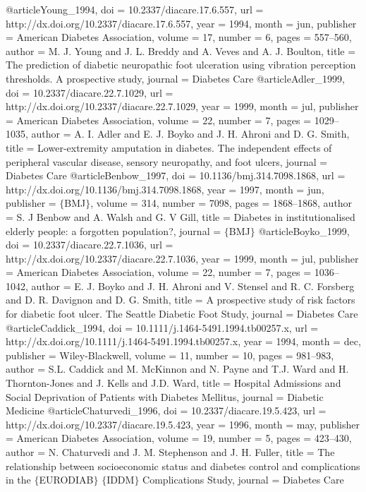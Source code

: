 @article{Young_1994,
	doi = {10.2337/diacare.17.6.557},
	url = {http://dx.doi.org/10.2337/diacare.17.6.557},
	year = 1994,
	month = {jun},
	publisher = {American Diabetes Association},
	volume = {17},
	number = {6},
	pages = {557--560},
	author = {M. J. Young and J. L. Breddy and A. Veves and A. J. Boulton},
	title = {The prediction of diabetic neuropathic foot ulceration using vibration perception thresholds. A prospective study},
	journal = {Diabetes Care}
}
@article{Adler_1999,
	doi = {10.2337/diacare.22.7.1029},
	url = {http://dx.doi.org/10.2337/diacare.22.7.1029},
	year = 1999,
	month = {jul},
	publisher = {American Diabetes Association},
	volume = {22},
	number = {7},
	pages = {1029--1035},
	author = {A. I. Adler and E. J. Boyko and J. H. Ahroni and D. G. Smith},
	title = {Lower-extremity amputation in diabetes. The independent effects of peripheral vascular disease, sensory neuropathy, and foot ulcers},
	journal = {Diabetes Care}
}
@article{Benbow_1997,
	doi = {10.1136/bmj.314.7098.1868},
	url = {http://dx.doi.org/10.1136/bmj.314.7098.1868},
	year = 1997,
	month = {jun},
	publisher = {$\lbrace$BMJ$\rbrace$},
	volume = {314},
	number = {7098},
	pages = {1868--1868},
	author = {S. J Benbow and A. Walsh and G. V Gill},
	title = {Diabetes in institutionalised elderly people: a forgotten population?},
	journal = {$\lbrace$BMJ$\rbrace$}
}
@article{Boyko_1999,
	doi = {10.2337/diacare.22.7.1036},
	url = {http://dx.doi.org/10.2337/diacare.22.7.1036},
	year = 1999,
	month = {jul},
	publisher = {American Diabetes Association},
	volume = {22},
	number = {7},
	pages = {1036--1042},
	author = {E. J. Boyko and J. H. Ahroni and V. Stensel and R. C. Forsberg and D. R. Davignon and D. G. Smith},
	title = {A prospective study of risk factors for diabetic foot ulcer. The Seattle Diabetic Foot Study},
	journal = {Diabetes Care}
}
@article{Caddick_1994,
	doi = {10.1111/j.1464-5491.1994.tb00257.x},
	url = {http://dx.doi.org/10.1111/j.1464-5491.1994.tb00257.x},
	year = 1994,
	month = {dec},
	publisher = {Wiley-Blackwell},
	volume = {11},
	number = {10},
	pages = {981--983},
	author = {S.L. Caddick and M. McKinnon and N. Payne and T.J. Ward and H. Thornton-Jones and J. Kells and J.D. Ward},
	title = {Hospital Admissions and Social Deprivation of Patients with Diabetes Mellitus},
	journal = {Diabetic Medicine}
}
@article{Chaturvedi_1996,
	doi = {10.2337/diacare.19.5.423},
	url = {http://dx.doi.org/10.2337/diacare.19.5.423},
	year = 1996,
	month = {may},
	publisher = {American Diabetes Association},
	volume = {19},
	number = {5},
	pages = {423--430},
	author = {N. Chaturvedi and J. M. Stephenson and J. H. Fuller},
	title = {The relationship between socioeconomic status and diabetes control and complications in the $\lbrace$EURODIAB$\rbrace$ $\lbrace$IDDM$\rbrace$ Complications Study},
	journal = {Diabetes Care}
}
